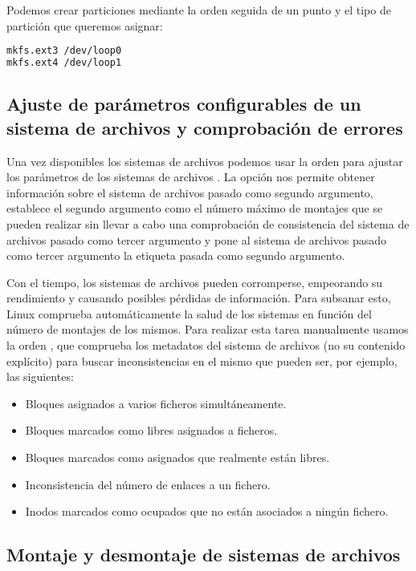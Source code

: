 \pagebreak

Podemos crear particiones mediante la orden  seguida de un punto y el tipo de partición que queremos asignar:

\begin{lstlisting}[language=Bash]
mkfs.ext3 /dev/loop0
mkfs.ext4 /dev/loop1
\end{lstlisting}

\subsection{Ajuste de parámetros configurables de un sistema de archivos y comprobación de errores}

Una vez disponibles los sistemas de archivos podemos usar la orden  para ajustar los parámetros de los sistemas de archivos .
La opción  nos permite obtener información sobre el sistema de archivos pasado como segundo argumento,  establece el segundo argumento como el número máximo de montajes que se pueden realizar sin llevar a cabo una comprobación de consistencia del sistema de archivos pasado como tercer argumento y  pone al sistema de archivos pasado como tercer argumento la etiqueta pasada como segundo argumento.

Con el tiempo, los sistemas de archivos pueden corromperse, empeorando su rendimiento y causando posibles pérdidas de información.
Para subsanar esto, Linux comprueba automáticamente la salud de los sistemas en función del número de montajes de los mismos.
Para realizar esta tarea manualmente usamos la orden , que comprueba los metadatos del sistema de archivos (no su contenido explícito) para buscar inconsistencias en el mismo que pueden ser, por ejemplo, las siguientes:

\begin{itemize}
	\item Bloques asignados a varios ficheros simultáneamente.
	\item Bloques marcados como libres asignados a ficheros.
	\item Bloques marcados como asignados que realmente están libres.
	\item Inconsistencia del número de enlaces a un fichero.
	\item Inodos marcados como ocupados que no están asociados a ningún fichero.
\end{itemize}

\subsection{Montaje y desmontaje de sistemas de archivos}

